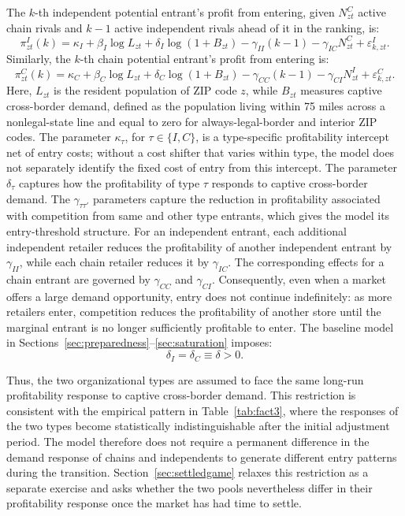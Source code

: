 \documentclass[english,12pt]{article}
\begin{document}
The $k$-th independent potential entrant's profit from entering, given $N^C_{zt}$ active chain rivals and $k-1$ active independent rivals ahead of it in the ranking, is:
\begin{equation}
\label{eq:piI}
\pi^I_{zt}(k)
=
\kappa_I
+
\beta_I \log L_{zt}
+
\delta_I \log(1+B_{zt})
-
\gamma_{II}(k-1)
-
\gamma_{IC}N^C_{zt}
+
\varepsilon^I_{k,zt}.
\end{equation}
Similarly, the $k$-th chain potential entrant's profit from entering is:
\begin{equation}
\label{eq:piC}
\pi^C_{zt}(k)
=
\kappa_C
+
\beta_C \log L_{zt}
+
\delta_C \log(1+B_{zt})
-
\gamma_{CC}(k-1)
-
\gamma_{CI}N^I_{zt}
+
\varepsilon^C_{k,zt}.
\end{equation}
Here, $L_{zt}$ is the resident population of ZIP code $z$, while $B_{zt}$ measures captive cross-border demand, defined as the population living within 75 miles across a nonlegal-state line and equal to zero for always-legal-border and interior ZIP codes. The parameter $\kappa_\tau$, for $\tau\in\{I,C\}$, is a type-specific profitability intercept net of entry costs; without a cost shifter that varies within type, the model does not separately identify the fixed cost of entry from this intercept. The parameter $\delta_\tau$ captures how the profitability of type $\tau$ responds to captive cross-border demand. The $\gamma_{\tau\tau'}$ parameters capture the reduction in profitability associated with competition from same and other type entrants, which gives the model its entry-threshold structure. For an independent entrant, each additional independent retailer reduces the profitability of another independent entrant by $\gamma_{II}$, while each chain retailer reduces it by $\gamma_{IC}$. The corresponding effects for a chain entrant are governed by $\gamma_{CC}$ and $\gamma_{CI}$. Consequently, even when a market offers a large demand opportunity, entry does not continue indefinitely: as more retailers enter, competition reduces the profitability of another store until the marginal entrant is no longer sufficiently profitable to enter.
The baseline model in Sections~\ref{sec:preparedness}--\ref{sec:saturation} imposes:
\begin{equation}
\label{eq:equal_demand_response}
\delta_I
=
\delta_C
\equiv
\delta
>
0.
\end{equation}

Thus, the two organizational types are assumed to face the same long-run profitability response to captive cross-border demand. This restriction is consistent with the empirical pattern in Table~\ref{tab:fact3}, where the responses of the two types become statistically indistinguishable after the initial adjustment period. The model therefore does not require a permanent difference in the demand response of chains and independents to generate different entry patterns during the transition. Section~\ref{sec:settledgame} relaxes this restriction as a separate exercise and asks whether the two pools nevertheless differ in their profitability response once the market has had time to settle.
\end{document}
